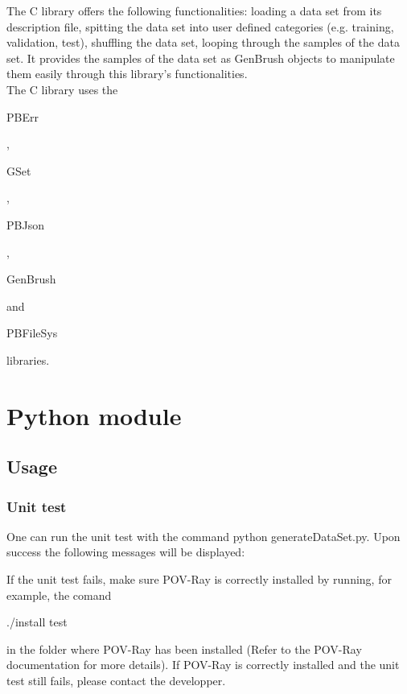 The C library offers the following functionalities: loading a data set from its description file, spitting the data set into user defined categories (e.g. training, validation, test), shuffling the data set, looping through the samples of the data set. It provides the samples of the data set as GenBrush objects to manipulate them easily through this library's functionalities.\\

The C library uses the \begin{ttfamily}PBErr\end{ttfamily}, \begin{ttfamily}GSet\end{ttfamily}, \begin{ttfamily}PBJson\end{ttfamily}, \begin{ttfamily}GenBrush\end{ttfamily} and \begin{ttfamily}PBFileSys\end{ttfamily} libraries.\\

\section{Python module}

\subsection{Usage}

\subsubsection{Unit test}

One can run the unit test with the command python generateDataSet.py. Upon success the following messages will be displayed:

\begin{scriptsize}
\begin{ttfamily}

\end{ttfamily}
\end{scriptsize}

If the unit test fails, make sure POV-Ray is correctly installed by running, for example, the comand \begin{ttfamily}./install test\end{ttfamily} in the folder where POV-Ray has been installed (Refer to the POV-Ray documentation for more details). If POV-Ray is correctly installed and the unit test still fails, please contact the developper.

